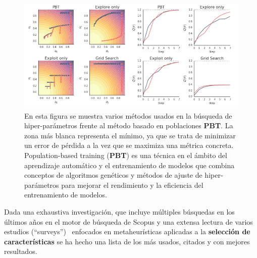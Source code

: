 \begin{figure}[H]
  \begin{center}
    \includegraphics[width=1\textwidth]{imagenes/pbt.png}
  \end{center}
  \caption[PBT en Redes Neuronales]{En esta figura se muestra varios métodos usados en la búsqueda de hiper-parámetros frente al método basado en poblaciones \textbf{PBT}. La zona más blanca representa el mínimo, ya que se trata de minimizar un error de pérdida a la vez que se maximiza una métrica concreta. Population-based training (\textbf{PBT}) es una técnica en el ámbito del aprendizaje automático y el entrenamiento de modelos que combina conceptos de algoritmos genéticos y métodos de ajuste de hiper-parámetros para mejorar el rendimiento y la eficiencia del entrenamiento de modelos.~\cite{jaderberg2017population}}
\end{figure}

Dada una exhaustiva investigación, que incluye múltiples búsquedas en los últimos años en el motor de búsqueda de Scopus y una extensa lectura de varios estudios (``surveys'')~\cite{dokeroglu_comprehensive_2022, agrawal_metaheuristic_2021, boussaid_survey_2013} enfocados en metaheurísticas aplicadas a la \textbf{selección de características} se ha hecho una lista de los más usados, citados y con mejores resultados.

